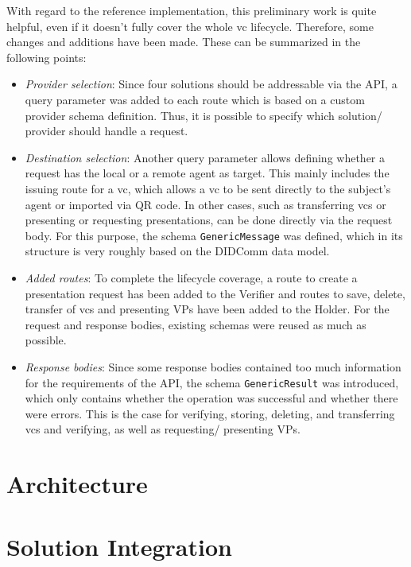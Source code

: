     With regard to the reference implementation, this preliminary work is quite helpful, even if it doesn't fully cover the whole \ac{vc} lifecycle. Therefore, some changes and additions have been made. These can be summarized in the following points:
    \begin{itemize}
        \item \textit{Provider selection}: Since four solutions should be addressable via the API, a query parameter was added to each route which is based on a custom provider schema definition. Thus, it is possible to specify which solution/ provider should handle a request.
        \item \textit{Destination selection}: Another query parameter allows defining whether a request has the local or a remote agent as target. This mainly includes the issuing route for a \ac{vc}, which allows a \ac{vc} to be sent directly to the subject's agent or imported via QR code. In other cases, such as transferring \acp{vc} or presenting or requesting presentations, can be done directly via the request body. For this purpose, the schema \texttt{GenericMessage} was defined, which in its structure is very roughly based on the DIDComm data model.
        \item \textit{Added routes}: To complete the lifecycle coverage, a route to create a presentation request has been added to the Verifier and routes to save, delete, transfer of \acp{vc} and presenting \acp{VP} have been added to the Holder. For the request and response bodies, existing schemas were reused as much as possible.
        \item \textit{Response bodies}: Since some response bodies contained too much information for the requirements of the API, the schema \texttt{GenericResult} was introduced, which only contains whether the operation was successful and whether there were errors. This is the case for verifying, storing, deleting, and transferring \acp{vc} and verifying, as well as requesting/ presenting \acp{VP}.
    \end{itemize}
    
    
    \vfill
    \section{Architecture}\label{section: architecture}
    \section{Solution Integration}\label{section: integration}
